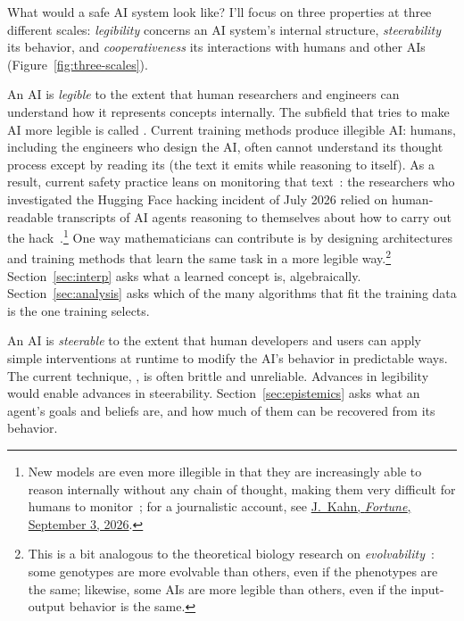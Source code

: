 What would a safe AI system look like? I'll focus on three properties at three different scales: \emph{legibility} concerns an AI system's internal structure, \emph{steerability} its behavior, and \emph{cooperativeness} its interactions with humans and other AIs (Figure~\ref{fig:three-scales}).

An AI is \emph{legible} to the extent that human researchers and engineers can understand how it represents concepts internally. The subfield that tries to make AI more legible is called . Current training methods produce illegible AI: humans, including the engineers who design the AI, often cannot understand its thought process except by reading its  (the text it emits while reasoning to itself). As a result, current safety practice leans on monitoring that text~\cite{korbak2025}: the researchers who investigated the Hugging Face hacking incident of July 2026 relied on human-readable transcripts of AI agents reasoning to themselves about how to carry out the hack~\cite{greenblatt2026}.\footnote{New models are even more illegible in that they are increasingly able to reason internally without any chain of thought, making them very difficult for humans to monitor~\cite{pachocki2026}; for a journalistic account, see \href{https://fortune.com/2026/09/03/reports-openais-astra-model-uses-a-new-more-efficient-ai-architecture-alarms-ai-safety-experts-who-worry-the-method-makes-models-harder-to-control/}{J.~Kahn, \emph{Fortune}, September 3, 2026}.}
One way mathematicians can contribute is by designing architectures and training methods that learn the same task in a more legible way.\footnote{This is a bit analogous to the theoretical biology research on \emph{evolvability}~\cite{wagner1996}: some genotypes are more evolvable than others, even if the phenotypes are the same; likewise, some AIs are more legible than others, even if the input-output behavior is the same.} Section~\ref{sec:interp} asks what a learned concept is, algebraically. Section~\ref{sec:analysis} asks which of the many algorithms that fit the training data is the one training selects.

An AI is \emph{steerable} to the extent that human developers and users can apply simple interventions at runtime to modify the AI's behavior in predictable ways. The current technique, , is often brittle and unreliable. Advances in legibility would enable advances in steerability. Section~\ref{sec:epistemics} asks what an agent's goals and beliefs are, and how much of them can be recovered from its behavior.

